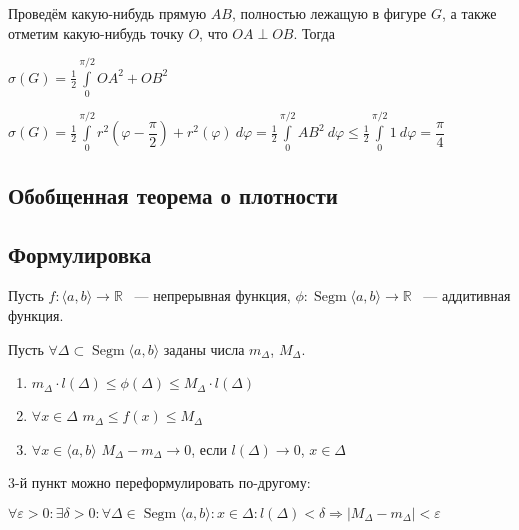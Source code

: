 \documentclass[../main.tex]{subfiles}
\begin{document}
            Проведём какую-нибудь прямую $AB$, полностью лежащую в фигуре $G$, а также отметим какую-нибудь точку $O$, что $OA \perp OB$. Тогда
            
            $\sigma(G) = \frac{1}{2} \int\limits^{\pi / 2}_0 OA^2 + OB^2$
            
            $\sigma(G) = \frac{1}{2} \int\limits^{\pi / 2}_0 r^2 (\varphi - \dfrac{\pi}{2}) + r^2 (\varphi) \ d \varphi = \frac{1}{2} \int\limits^{\pi / 2}_0 AB^2 \ d \varphi \leq \frac{1}{2} \int\limits^{\pi / 2}_0 1 \ d \varphi = \dfrac{\pi}{4}$
            
\newpage


\subsection{Обобщенная теорема о плотности}
\subsection*{Формулировка}
            
            Пусть $f : \langle a, b \rangle \rightarrow \mathbb{R}$ ~--- непрерывная функция, $\phi : \operatorname{Segm} \langle a, b \rangle \rightarrow \mathbb{R}$ ~--- аддитивная функция.
        
            Пусть $\forall \Delta \subset \operatorname{Segm} \langle a, b \rangle$ заданы числа $m_{\Delta}$, $M_{\Delta}$.
        
            \begin{enumerate}
        
                \item $m_{\Delta} \cdot l(\Delta) \leq \phi(\Delta) \leq M_{\Delta} \cdot l(\Delta)$
            
                \item $\forall x \in \Delta$ $m_{\Delta} \leq f(x) \leq M_{\Delta}$
            
                \item $\forall x \in \langle a, b \rangle$ $M_{\Delta} - m_{\Delta} \rightarrow 0$, если $l(\Delta) \rightarrow 0$, $x \in \Delta$
            
            \end{enumerate}
            
            3-й пункт можно переформулировать по-другому:
            
            $\forall \varepsilon > 0 : \exists \delta > 0 : \forall \Delta \in \operatorname{Segm} \langle a, b \rangle : x \in \Delta : l(\Delta) < \delta \Longrightarrow \left| M_{\Delta} - m_{\Delta} \right| < \varepsilon$
        
\end{document}
